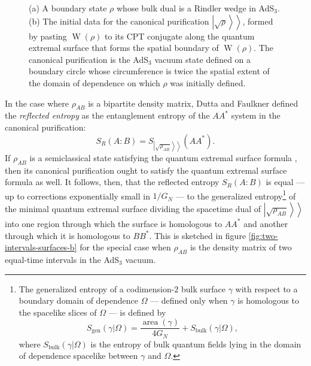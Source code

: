 \documentclass[a4paper,11pt]{article}
\newcommand{\area}{\operatorname{area}}
\newcommand{\W}{\operatorname{W}}
\newcommand{\kett}[1]{\left.\left| #1 \right\rangle \right\rangle}
\begin{document}
\begin{figure}
    \centering
    \caption{(a) A boundary state $\rho$ whose bulk dual is a Rindler wedge in AdS$_3$. (b) The initial data for the canonical purification $\kett{\sqrt{\rho}}$, formed by pasting $\W(\rho)$ to its CPT conjugate along the quantum extremal surface that forms the spatial boundary of $\W(\rho)$. The canonical purification is the AdS$_3$ vacuum state defined on a boundary circle whose circumference is twice the spatial extent of the domain of dependence on which $\rho$ was initially defined.}
    \label{fig:simple-pasting}
\end{figure}

In the case where $\rho_{AB}$ is a bipartite density matrix, Dutta and Faulkner defined the \emph{reflected entropy} as the entanglement entropy of the $AA^*$ system in the canonical purification:
\begin{equation}
    S_R(A:B) = S_{\kett{\sqrt{\rho_{AB}}}}(AA^*).
\end{equation}
If $\rho_{AB}$ is a semiclassical state satisfying the quantum extremal surface formula \cite{QES}, then its canonical purification ought to satisfy the quantum extremal surface formula as well. It follows, then, that the reflected entropy $S_R(A:B)$ is equal --- up to corrections exponentially small in $1/G_N$ --- to the generalized entropy\footnote{\label{footnote:gen-entropy}The generalized entropy of a codimension-$2$ bulk surface $\gamma$ with respect to a boundary domain of dependence $\Omega$ --- defined only when $\gamma$ is homologous to the spacelike slices of $\Omega$ --- is defined by
\begin{equation*}
    S_{\text{gen}}(\gamma|\Omega) = \frac{\area(\gamma)}{4 G_N} + S_{\text{bulk}}(\gamma|\Omega),
\end{equation*}
where $S_{\text{bulk}}(\gamma|\Omega)$ is the entropy of bulk quantum fields lying in the domain of dependence spacelike between $\gamma$ and $\Omega$.} of the minimal quantum extremal surface dividing the spacetime dual of $\kett{\sqrt{\rho_{AB}}}$ into one region through which the surface is homologous to $AA^*$ and another through which it is homologous to $BB^*$. This is sketched in figure \ref{fig:two-intervals-surfaces-b} for the special case when $\rho_{AB}$ is the density matrix of two equal-time intervals in the AdS$_3$ vacuum. 
\end{document}
